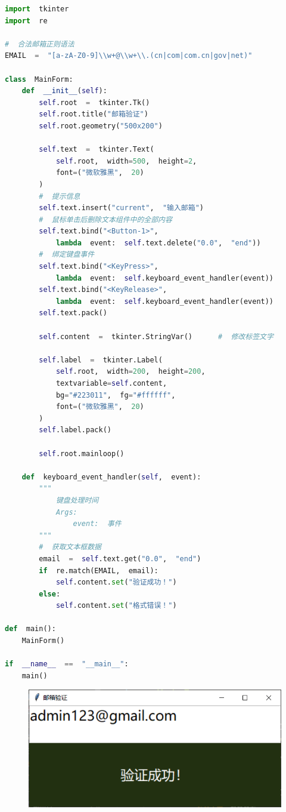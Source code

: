 \vspace{0.5cm}


\begin{lstlisting}[language=Python]
import  tkinter
import  re

#  合法邮箱正则语法
EMAIL  =  "[a-zA-Z0-9]\\w+@\\w+\\.(cn|com|com.cn|gov|net)"

class  MainForm:
    def  __init__(self):
        self.root  =  tkinter.Tk()
        self.root.title("邮箱验证")
        self.root.geometry("500x200")

        self.text  =  tkinter.Text(
            self.root,  width=500,  height=2,
            font=("微软雅黑",  20)
        )
        #  提示信息
        self.text.insert("current",  "输入邮箱")
        #  鼠标单击后删除文本组件中的全部内容
        self.text.bind("<Button-1>",  
            lambda  event:  self.text.delete("0.0",  "end"))
        #  绑定键盘事件
        self.text.bind("<KeyPress>",  
            lambda  event:  self.keyboard_event_handler(event))
        self.text.bind("<KeyRelease>",  
            lambda  event:  self.keyboard_event_handler(event))
        self.text.pack()

        self.content  =  tkinter.StringVar()      #  修改标签文字
        
        self.label  =  tkinter.Label(
            self.root,  width=200,  height=200,
            textvariable=self.content,
            bg="#223011",  fg="#ffffff",
            font=("微软雅黑",  20)
        )
        self.label.pack()

        self.root.mainloop()
    
    def  keyboard_event_handler(self,  event):
        """
            键盘处理时间
            Args:
                event:  事件
        """
        #  获取文本框数据
        email  =  self.text.get("0.0",  "end")
        if  re.match(EMAIL,  email):
            self.content.set("验证成功！")
        else:
            self.content.set("格式错误！")

def  main():
    MainForm()
    
if  __name__  ==  "__main__":
    main()
\end{lstlisting}

\begin{tcolorbox}
	\begin{figure}[H]
		\centering
		\includegraphics[]{img/C13/13-2/2.png}
	\end{figure}
\end{tcolorbox}

